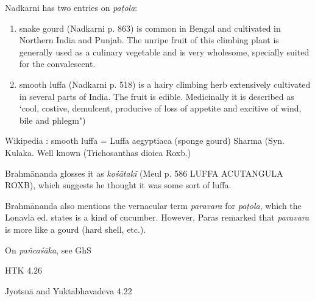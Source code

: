 \begin{ekdosis}
\begin{philcomm}[hp01_062]
Nadkarni has two entries on \emph{paṭola}:
\begin{enumerate}
\item snake gourd (Nadkarni p. 863) is common in Bengal and cultivated in Northern India and Punjab. The unripe fruit of this climbing plant is generally used as a culinary vegetable and is very wholesome, specially suited for the convalescent.

\item smooth luffa (Nadkarni p. 518) is a hairy climbing herb extensively cultivated in several parts of India. The fruit is edible. Medicinally it is described as `cool, costive, demulcent, producive of loss of appetite and excitive of wind, bile and phlegm")
\end{enumerate}

Wikipedia : smooth luffa = Luffa aegyptiaca (sponge gourd)
Sharma (Syn. Kulaka. Well known (Trichosanthas dioica Roxb.)

Brahmānanda glosses it as \emph{kośātakī} (Meul p. 586 LUFFA ACUTANGULA ROXB), which suggests he thought it was some sort of luffa.

Brahmānanda also mentions the vernacular term \emph{paravara} for \emph{paṭola}, which the Lonavla ed. states is a kind of cucumber. However, Paras remarked that \emph{paravara} is more like a gourd (hard shell, etc.).

On \emph{pañcaśāka}, see GhS

\begin{versinnote}
\end{versinnote}

HTK 4.26

\begin{versinnote}
\end{versinnote}

Jyotsnā and Yuktabhavadeva 4.22

\begin{versinnote}
\end{versinnote}


\end{philcomm}
\end{ekdosis}
